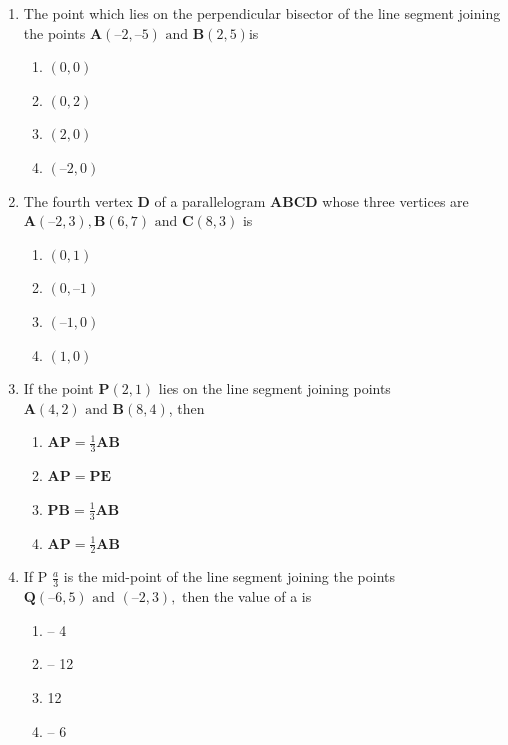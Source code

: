 \documentclass[12pt]{article}
\let\vec\mathbf
\begin{document}
\begin{enumerate}
\item The point which lies on the perpendicular bisector of the line segment joining the
	points $\vec{A} (–2, –5)\text { and } \vec{B} (2, 5) $is
\begin{enumerate}
\item  	$(0, 0)$
\item  $(0, 2)$ 
\item  $(2, 0)$ 
\item  $(–2, 0)$
\end{enumerate}
\item The fourth vertex $\vec{D}$ of a parallelogram $\vec{ABCD}$ whose three vertices are
	$\vec{A} (–2, 3), \vec{B} (6, 7)\text { and } \vec{C} (8, 3)$ is
\begin{enumerate}
	\item $(0, 1)$
	\item $(0, –1)$
	\item $ (–1,0)$
	\item$(1, 0)$
\end{enumerate}
\item If the point $\vec{P} (2, 1)$ lies on the line segment joining points$\vec{A} (4, 2) \text{ and } \vec{B} (8, 4)$,
then
\begin{enumerate}
	\item $\vec{AP} =\frac{1}{3}\vec{AB}$ 
\item $\vec{AP}=\vec{PE}$
\item $\vec{PB}=\frac{1}{3}\vec{AB}$
\item$\vec{AP}=\frac{1}{2}\vec{AB}$
 \end{enumerate}
 \item If P $\frac{a}{3}$ is the mid-point of the line segment joining the points $\vec{Q} (– 6, 5) \text{ and }(– 2, 3),$ then the value of a is
\begin{enumerate}
\item – 4
\item – 12
\item 12
\item – 6
\end{enumerate}


\end{enumerate}
\end{document}
